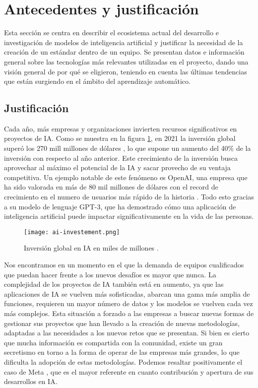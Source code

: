 \section{Antecedentes y justificación}
Esta sección se centra en describir el ecosistema actual del desarrollo e investigación 
de modelos de inteligencia artificial y justificar la necesidad de la creación de un
estándar dentro de un equipo. Se presentan datos e información general sobre las 
tecnologías más relevantes utilizadas en el proyecto, dando una visión general 
de por qué se eligieron, teniendo en cuenta las últimas tendencias que están
surgiendo en el ámbito del aprendizaje automático.

\subsection{Justificación}
Cada año, más empresas y organizaciones invierten recursos significativos en 
proyectos de IA. Como se muestra en la figura \ref{fig:ai-investement},
en 2021 la inversión global superó los 270 mill millones de dólares \cite{Letzing2024-nn},
lo que supone un aumento del 40\% de la inversión con respecto al año anterior.
Este crecimiento de la inversión busca aprovechar al máximo el potencial de la IA 
y sacar provecho de su ventaja competitiva. Un ejemplo notable de este fenómeno es OpenAI, 
una empresa que ha sido valorada en más de 80 mil millones de dólares \cite{noauthor_2024-uj} con el record de crecimiento 
en el numero de usuarios más rápido de la historia \cite{Armenta2023-xt}. Todo esto
gracias a su modelo de lenguaje GPT-3, que ha demostrado cómo una aplicación de 
inteligencia artificial puede impactar significativamente en la vida de las personas.

\begin{figure}[ht]
    \centering
    \texttt{[image: ai-investement.png]}
    \caption{Inversión global en IA en miles de millones \cite{Letzing2024-nn}.}
    \label{fig:ai-investement}
\end{figure}

Nos encontramos en un momento en el que la demanda de equipos cualificados 
que puedan hacer frente a los nuevos desafíos es mayor que nunca. La complejidad
de los proyectos de IA también está en aumento, ya que las aplicaciones de IA
se vuelven más sofisticadas, abarcan una gama más amplia de funciones, requieren
un mayor número de datos y los modelos se vuelven cada vez más complejos. Esta
situación a forzado a las empresas a buscar nuevas formas de gestionar sus proyectos
que han llevado a la creación de nuevas metodologías, adaptadas a las necesidades
a los nuevos retos que se presentan. Si bien es cierto que mucha información es
compartida con la comunidad, existe un gran secretismo en torno a la forma de operar
de las empresas más grandes, lo que dificulta la adopción de estas metodologías.
Podemos resaltar positivamente el caso de Meta \cite{metaia}, que es el mayor 
referente en cuanto contribución y apertura de sus desarrollos en IA.\medskip

